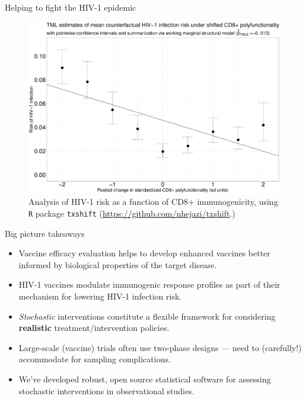 \documentclass{beamer}
\begin{document}

\begin{frame}[c]{Helping to fight the HIV-1 epidemic}

\begin{figure}[H]
  \centering
  \includegraphics[scale=0.2]{cd8_msm_tmle_summary}
  \caption{
    Analysis of HIV-1 risk as a function of CD8+ immunogenicity, using
    \texttt{R} package \texttt{txshift}
    (\url{https://github.com/nhejazi/txshift}.)
  }
\end{figure}

\note{
}

\end{frame}


\begin{frame}[c]{Big picture takeaways}

\begin{center}
\begin{itemize}
  \itemsep8pt
  \item Vaccine efficacy evaluation helps to develop enhanced vaccines better
    informed by biological properties of the target disease.
  \item HIV-1 vaccines modulate immunogenic response profiles as part of their
    mechanism for lowering HIV-1 infection risk.
  \item \textit{Stochastic} interventions constitute a flexible framework for
    considering \textbf{realistic} treatment/intervention policies.
  \item Large-scale (vaccine) trials often use two-phase designs --- need to
    (carefully!) accommodate for sampling complications.
  \item We've developed robust, open source statistical software for assessing
    stochastic interventions in observational studies.
\end{itemize}
\end{center}

\note{
}

\end{frame}
\end{document}
